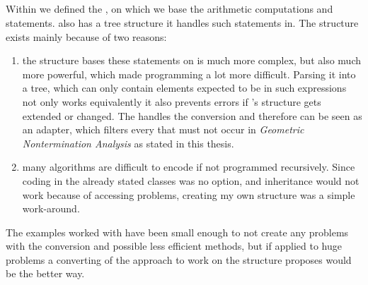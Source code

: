 \subsection{\rpntree}
Within  we defined the \rpntree, on which we base the arithmetic computations and statements. \aprove also has a tree structure it handles such statements in. The \rpntree structure exists mainly because of two reasons:
\begin{enumerate}
	\item the structure \aprove bases these statements on is much more complex, but also much more powerful, which made programming a lot more difficult. Parsing it into a tree, which can only contain elements expected to be in such expressions not only works equivalently it also prevents errors if \aprove's structure gets extended or changed. The  handles the conversion and therefore can be seen as an adapter, which filters every \its that must not occur in \textit{Geometric Nontermination Analysis} as stated in this thesis.
	\item many algorithms are difficult to encode if not programmed recursively. Since coding in the already stated classes was no option, and inheritance would not work because of accessing problems, creating my own structure was a simple work-around.
\end{enumerate}
The examples worked with have been small enough to not create any problems with the conversion and possible less efficient methods, but if applied to huge problems a converting of the approach to work on the structure \aprove proposes would be the better way.